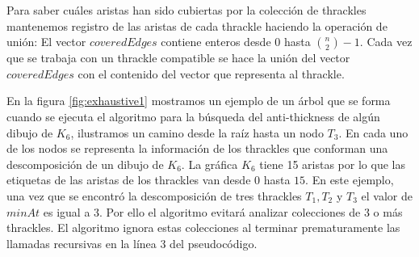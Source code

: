  Para saber cuáles aristas han sido cubiertas por la colección de thrackles mantenemos registro de las
  aristas de cada thrackle haciendo la operación de unión: El vector $coveredEdges$ contiene enteros desde
  $0$ hasta $\binom{n}{2}-1$. Cada vez que se trabaja con un thrackle compatible se hace la unión del vector
  $coveredEdges$ con el contenido del vector que representa al thrackle.

  En la figura \ref{fig:exhaustive1} mostramos un ejemplo de un árbol que se forma cuando se ejecuta el
  algoritmo para la búsqueda del anti-thickness de algún dibujo de $K_6$, ilustramos un camino desde la
  raíz hasta un nodo $T_3$. En cada uno de los nodos se representa la información de los thrackles que
  conforman una descomposición de un dibujo de $K_6$. La gráfica $K_6$ tiene 15 aristas por lo que las
  etiquetas de las aristas de los thrackles van desde $0$ hasta $15$. En este ejemplo, una vez que se
  encontró la descomposición de tres thrackles $T_1,T_2$ y $T_3$ el valor de $minAt$ es igual a 3. Por ello
  el algoritmo evitará analizar colecciones de 3 o más thrackles. El algoritmo ignora estas colecciones al
  terminar prematuramente las llamadas recursivas en la línea 3 del pseudocódigo.
